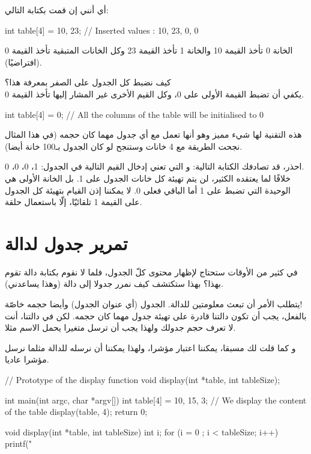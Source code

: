 أي أنني إن قمت بكتابة التالي:

\begin{Csource}
int table[4] = {10, 23}; // Inserted values : 10, 23, 0, 0
\end{Csource}

الخانة 0 تأخذ القيمة 10 والخانة 1 تأخذ القيمة 23 وكل الخانات المتبقية تأخذ القيمة 0 (افتراضيًا).

كيف نضبط كل الجدول على الصفر بمعرفة هذا؟\\
يكفي أن تضبط القيمة الأولى على 0، وكل القيم الأخرى غير المشار إليها تأخذ القيمة 0.

\begin{Csource}
int table[4] = {0}; // All the columns of the table will be initialised to 0
\end{Csource}

هذه التقنية لها شيء مميز وهو أنها تعمل مع أي جدول مهما كان حجمه (في هذا المثال نجحت الطريقة مع 4 خانات وستنجح لو كان الجدول بـ100 خانة أيضا).

\begin{critical}
احذر، قد تصادفك الكتابة التالية:
و التي تعني إدخال القيم التالية في الجدول:
1، 0، 0، 0.\\
خلافًا لما يعتقده الكثير، لن يتم تهيئة كل خانات الجدول على 1. بل الخانة الأولى هي الوحيدة التي تضبط على 1 أما الباقي فعلى 0. لا يمكننا إذن القيام بتهيئة كل الجدول على القيمة 1 تلقائيّا، إلّا باستعمال حلقة.
\end{critical}

\section{تمرير جدول لدالة}

في كثير من الأوقات ستحتاج لإظهار محتوى كلّ الجدول، فلما لا نقوم بكتابة دالة تقوم بهذا؟ بهذا ستكتشف كيف نمرر جدولا إلى دالة (وهذا يساعدني).

يتطلب الأمر أن تبعث معلومتين للدالة. الجدول (أي عنوان الجدول) وأيضا حجمه خاصّة!\\
بالفعل، يجب أن تكون دالتنا قادرة على تهيئة جدول مهما كان حجمه. لكن في دالتنا، أنت لا تعرف حجم جدولك ولهذا يجب أن ترسل متغيرا يحمل الاسم
مثلا.

و كما قلت لك مسبقا، يمكننا اعتبار
مؤشرا، ولهذا يمكننا أن نرسله للدالة مثلما نرسل مؤشرا عاديا.

\begin{Csource}
// Prototype of the display function
void display(int *table, int tableSize);

int main(int argc, char *argv[])
{
	int table[4] = {10, 15, 3};
 	// We display the content of the table
	display(table, 4);
	return 0;
}

void display(int *table, int tableSize)
{
	int i;
	for (i = 0 ; i < tableSize; i++)
	{
    		printf("%
	}
}
\end{Csource}

